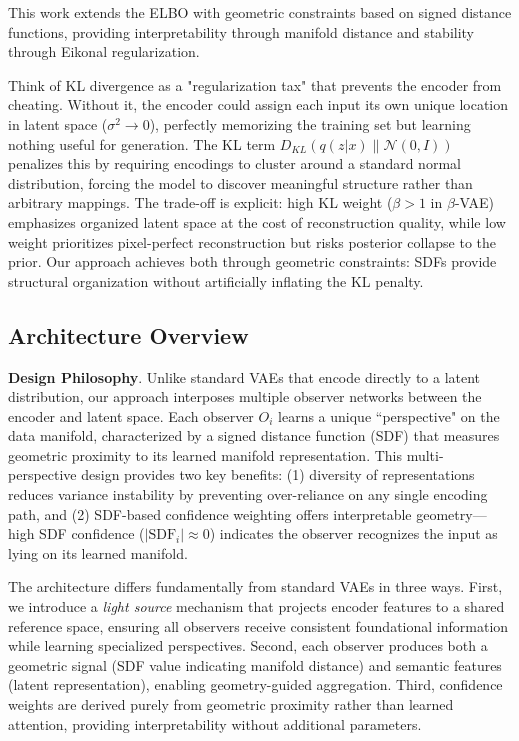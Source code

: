 \documentclass[10pt,twocolumn,letterpaper]{article}
\begin{document}
This work extends the ELBO with geometric constraints based on signed distance functions, providing interpretability through manifold distance and stability through Eikonal regularization.

\begin{intuitionbox}
Think of KL divergence as a "regularization tax" that prevents the encoder from cheating. Without it, the encoder could assign each input its own unique location in latent space ($\sigma^2 \to 0$), perfectly memorizing the training set but learning nothing useful for generation. The KL term $D_{KL}(q(z|x) \| \mathcal{N}(0, I))$ penalizes this by requiring encodings to cluster around a standard normal distribution, forcing the model to discover meaningful structure rather than arbitrary mappings. The trade-off is explicit: high KL weight ($\beta > 1$ in $\beta$-VAE) emphasizes organized latent space at the cost of reconstruction quality, while low weight prioritizes pixel-perfect reconstruction but risks posterior collapse to the prior. Our approach achieves both through geometric constraints: SDFs provide structural organization without artificially inflating the KL penalty.
\end{intuitionbox}

\subsection{Architecture Overview}

\textbf{Design Philosophy}. Unlike standard VAEs that encode directly to a latent distribution, our approach interposes multiple observer networks between the encoder and latent space. Each observer $O_i$ learns a unique ``perspective" on the data manifold, characterized by a signed distance function (SDF) that measures geometric proximity to its learned manifold representation. This multi-perspective design provides two key benefits: (1) diversity of representations reduces variance instability by preventing over-reliance on any single encoding path, and (2) SDF-based confidence weighting offers interpretable geometry—high SDF confidence ($|\text{SDF}_i| \approx 0$) indicates the observer recognizes the input as lying on its learned manifold.

The architecture differs fundamentally from standard VAEs in three ways. First, we introduce a \textit{light source} mechanism that projects encoder features to a shared reference space, ensuring all observers receive consistent foundational information while learning specialized perspectives. Second, each observer produces both a geometric signal (SDF value indicating manifold distance) and semantic features (latent representation), enabling geometry-guided aggregation. Third, confidence weights are derived purely from geometric proximity rather than learned attention, providing interpretability without additional parameters.
\end{document}
